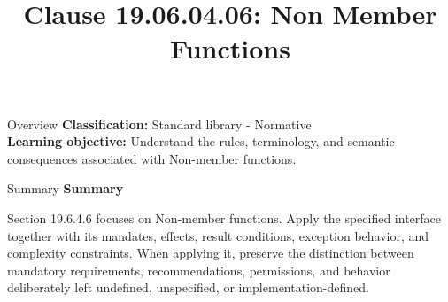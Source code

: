 \documentclass[10pt,letterpaper]{article}
\title{Clause 19.06.04.06: Non Member Functions}
\author{}
\date{}
\begin{document}
\maketitle
\begin{CornellOverviewBox}{Overview}
\textbf{Classification:} Standard library - Normative\\[2pt]
\textbf{Learning objective:} Understand the rules, terminology, and semantic consequences associated with Non-member functions.
\end{CornellOverviewBox}\begin{CornellSummaryBox}{Summary}
{\sffamily\bfseries\color{Accent} Summary}\par\vspace{3pt}Section 19.6.4.6 focuses on Non-member functions. Apply the specified interface together with its mandates, effects, result conditions, exception behavior, and complexity constraints. When applying it, preserve the distinction between mandatory requirements, recommendations, permissions, and behavior deliberately left undefined, unspecified, or implementation-defined.
\end{CornellSummaryBox}
\end{document}
